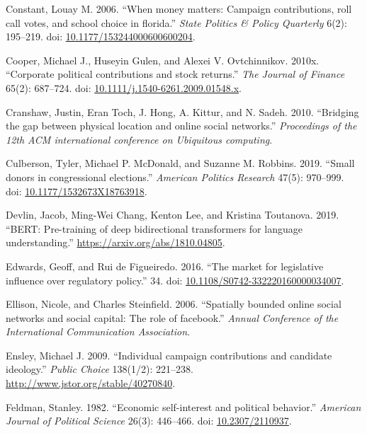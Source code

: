 \documentclass[12pt,]{article}
\newlength{\cslhangindent}
\newenvironment{CSLReferences}%
    {\setlength{\parindent}{0pt}%
    \everypar{\setlength{\hangindent}{\cslhangindent}}\ignorespaces}%
    {\par}
\begin{document}
\begin{CSLReferences}{1}{0}
\leavevmode{}%
Constant, Louay M. 2006. {``When money matters: Campaign contributions,
roll call votes, and school choice in florida.''} \emph{State Politics
\& Policy Quarterly} 6(2): 195--219. doi:
\href{https://doi.org/10.1177/153244000600600204}{10.1177/153244000600600204}.

\leavevmode{}%
Cooper, Michael J., Huseyin Gulen, and Alexei V. Ovtchinnikov. 2010x.
{``Corporate political contributions and stock returns.''} \emph{The
Journal of Finance} 65(2): 687--724. doi:
\href{https://doi.org/10.1111/j.1540-6261.2009.01548.x}{10.1111/j.1540-6261.2009.01548.x}.

\leavevmode{}%
Cranshaw, Justin, Eran Toch, J. Hong, A. Kittur, and N. Sadeh. 2010.
{``Bridging the gap between physical location and online social
networks.''} \emph{Proceedings of the 12th ACM international conference
on Ubiquitous computing}.

\leavevmode{}%
Culberson, Tyler, Michael P. McDonald, and Suzanne M. Robbins. 2019.
{``Small donors in congressional elections.''} \emph{American Politics
Research} 47(5): 970--999. doi:
\href{https://doi.org/10.1177/1532673X18763918}{10.1177/1532673X18763918}.

\leavevmode{}%
Devlin, Jacob, Ming-Wei Chang, Kenton Lee, and Kristina Toutanova. 2019.
{``BERT: Pre-training of deep bidirectional transformers for language
understanding.''} \url{https://arxiv.org/abs/1810.04805}.

\leavevmode{}%
Edwards, Geoff, and Rui de Figueiredo. 2016. {``The market for
legislative influence over regulatory policy.''} 34. doi:
\href{https://doi.org/10.1108/S0742-332220160000034007}{10.1108/S0742-332220160000034007}.

\leavevmode{}%
Ellison, Nicole, and Charles Steinfield. 2006. {``Spatially bounded
online social networks and social capital: The role of facebook.''}
\emph{Annual Conference of the International Communication Association}.

\leavevmode{}%
Ensley, Michael J. 2009. {``Individual campaign contributions and
candidate ideology.''} \emph{Public Choice} 138(1/2): 221--238.
\url{http://www.jstor.org/stable/40270840}.

\leavevmode{}%
Feldman, Stanley. 1982. {``Economic self-interest and political
behavior.''} \emph{American Journal of Political Science} 26(3):
446--466. doi: \href{https://doi.org/10.2307/2110937}{10.2307/2110937}.


\end{CSLReferences}
\end{document}
